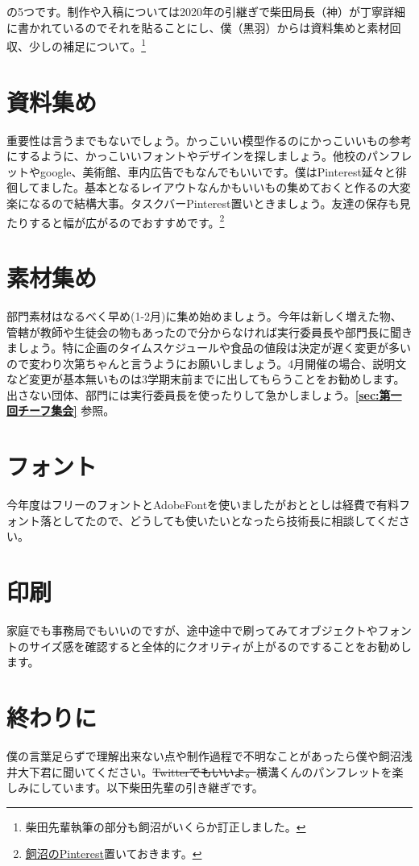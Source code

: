 \documentclass[dvipdfmx,jb5]{jreport}
\begin{document}
の5つです。制作や入稿については2020年の引継ぎで柴田局長（神）が丁寧詳細に書かれているのでそれを貼ることにし、僕（黒羽）からは資料集めと素材回収、少しの補足について。\footnote{柴田先輩執筆の部分も飼沼がいくらか訂正しました。}

\section{資料集め}
重要性は言うまでもないでしょう。かっこいい模型作るのにかっこいいもの参考にするように、かっこいいフォントやデザインを探しましょう。他校のパンフレットやgoogle、美術館、車内広告でもなんでもいいです。僕はPinterest延々と徘徊してました。基本となるレイアウトなんかもいいもの集めておくと作るの大変楽になるので結構大事。タスクバーPinterest置いときましょう。友達の保存も見たりすると幅が広がるのでおすすめです。\footnote{\href{https://www.pinterest.jp/mpse_}{飼沼のPinterest}置いておきます。}

\section{素材集め}
部門素材はなるべく早め(1-2月)に集め始めましょう。今年は新しく増えた物、管轄が教師や生徒会の物もあったので分からなければ実行委員長や部門長に聞きましょう。特に企画のタイムスケジュールや食品の値段は決定が遅く変更が多いので変わり次第ちゃんと言うようにお願いしましょう。4月開催の場合、説明文など変更が基本無いものは3学期末前までに出してもらうことをお勧めします。出さない団体、部門には実行委員長を使ったりして急かしましょう。{\bf \ref{sec:第一回チーフ集会}} 参照。

\section{フォント}
今年度はフリーのフォントとAdobeFontを使いましたがおととしは経費で有料フォント落としてたので、どうしても使いたいとなったら技術長に相談してください。

\section{印刷}
家庭でも事務局でもいいのですが、途中途中で刷ってみてオブジェクトやフォントのサイズ感を確認すると全体的にクオリティが上がるのですることをお勧めします。

\section{終わりに}
僕の言葉足らずで理解出来ない点や制作過程で不明なことがあったら僕や飼沼浅井大下君に聞いてください。\sout{Twitterでもいいよ。}横溝くんのパンフレットを楽しみにしています。以下柴田先輩の引き継ぎです。
\end{document}
